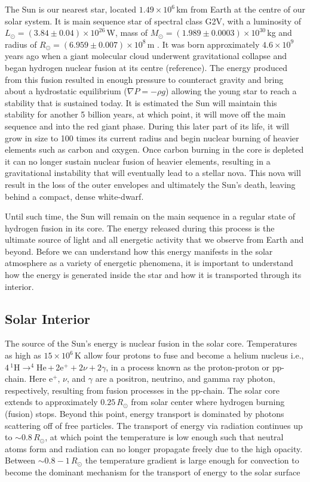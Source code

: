 The Sun is our nearest star, located $1.49\times10^6$\,km from Earth at the centre of our solar system. It is main sequence star of spectral class G2V, with a luminosity of $L_{\odot}=(3.84\pm 0.04)\times10^{26}$\,W, mass of $M_{\odot}=(1.989\pm0.0003)\times10^{30}$\,kg and radius of $R_{\odot}=(6.959\pm0.007)\times10^8$\,m \citep{foukal2004}. It was born approximately $4.6 \times 10^9$\,years ago when a giant molecular cloud underwent gravitational collapse and began hydrogen nuclear fusion at its centre (reference). The energy produced from this fusion resulted in enough pressure to counteract gravity and bring about a hydrostatic equilibrium ($\nabla P = -\rho g$) allowing the young star to reach a stability that is sustained today. It is estimated the Sun will maintain this stability for another 5 billion years, at which point, it will move off the main sequence and into the red giant phase. During this later part of its life, it will grow in size to 100 times its current radius and begin nuclear burning of heavier elements such as carbon and oxygen. Once carbon burning in the core is depleted it can no longer sustain nuclear fusion of heavier elements, resulting in a gravitational instability that will eventually lead to a stellar nova. This nova will result in the loss of the outer envelopes and ultimately the Sun's death, leaving behind a compact, dense white-dwarf.

Until such time, the Sun will remain on the main sequence in a regular state of hydrogen fusion in its core. The energy released during this process is the ultimate source of light and all energetic activity that we observe from Earth and beyond. Before we can understand how this energy manifests in the solar atmosphere as a variety of energetic phenomena, it is important to understand how the energy is generated inside the star and how it is transported through its interior.

\subsection{Solar Interior}\label{sec:10}

The source of the Sun's energy is nuclear fusion in the solar core. Temperatures as high as $15\times10^{6}$\,K allow four protons to fuse and become a helium nucleus i.e., $4\,^{1}$H$\rightarrow ^{4}$He\,+\,2e$^{+}+2\nu+2\gamma$, in a process known as the proton-proton or pp-chain. Here e$^+$, $\nu$, and $\gamma$ are a positron, neutrino, and gamma ray photon, respectively, resulting from fusion processes in the pp-chain. The solar core extends to approximately $0.25\,R_{\odot}$ from solar center where hydrogen burning (fusion) stops. Beyond this point, energy transport is dominated by photons scattering off of free particles. The transport of energy via radiation continues up to $\sim0.8\,R_{\odot}$, at which point the temperature is low enough such that neutral atoms form and radiation can no longer propagate freely due to the high opacity. Between $\sim0.8-1\,R_{\odot}$ the temperature gradient is large enough for convection to become the dominant mechanism for the transport of energy to the solar surface


